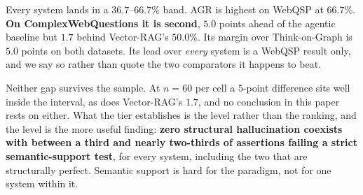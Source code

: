 Every system lands in a $36.7$--$66.7\%$ band. AGR is highest on WebQSP
at $66.7\%$. \textbf{On ComplexWebQuestions it is second}, $5.0$ points
ahead of the agentic baseline but $1.7$ behind Vector-RAG's $50.0\%$.
Its margin over Think-on-Graph is $5.0$ points on both datasets. Its
lead over \emph{every} system is a WebQSP result only, and we say so
rather than quote the two comparators it happens to beat.

Neither gap survives the sample. At $n = 60$ per cell a $5$-point
difference sits well inside the interval, as does Vector-RAG's $1.7$,
and no conclusion in this paper rests on either. What the tier
establishes is the level rather than the ranking, and the level is the
more useful finding: \textbf{zero structural hallucination coexists with
between a third and nearly two-thirds of assertions failing a strict
semantic-support test}, for every system, including the two that are
structurally perfect. Semantic support is hard for the paradigm, not for
one system within it.
